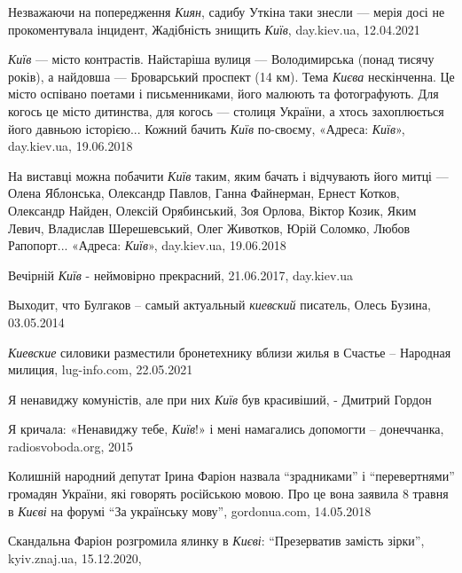 Незважаючи на попередження \emph{Киян}, садибу Уткіна таки знесли — мерія досі не
прокоментувала інцидент, Жадібність знищить \emph{Київ}, day.kiev.ua, 12.04.2021

\emph{Київ} — місто контрастів. Найстаріша вулиця — Володимирська (понад тисячу
років), а найдовша — Броварський проспект (14 км). Тема \emph{Києва} нескінченна. Це
місто оспівано поетами і письменниками, його малюють та фотографують. Для
когось це місто дитинства, для когось — столиця України, а хтось захоплюється
його давньою історією...  Кожний бачить \emph{Київ} по-своєму, 
«Адреса: \emph{Київ}», day.kiev.ua, 19.06.2018

На виставці можна побачити \emph{Київ} таким, яким бачать і відчувають його митці —
Олена Яблонська, Олександр Павлов, Ганна Файнерман, Ернест Котков, Олександр
Найден, Олексій Орябинський, Зоя Орлова, Віктор Козик, Яким Левич, Владислав
Шерешевський, Олег Животков, Юрій Соломко, Любов Рапопорт...
«Адреса: \emph{Київ}», day.kiev.ua, 19.06.2018

Вечірній \emph{Київ} - неймовірно прекрасний, 21.06.2017, day.kiev.ua

Выходит, что Булгаков – самый актуальный \emph{киевский} писатель, Олесь
Бузина, 03.05.2014

\emph{Киевские} силовики разместили бронетехнику вблизи жилья в Счастье – Народная
милиция, lug-info.com, 22.05.2021

Я ненавиджу комуністів, але при них \emph{Київ} був красивіший, - Дмитрий Гордон

Я кричала: «Ненавиджу тебе, \emph{Київ}!» і мені намагались допомогти –
донеччанка, radiosvoboda.org, 2015

Колишній народний депутат Ірина Фаріон назвала \enquote{зрадниками} і
\enquote{перевертнями} громадян України, які говорять російською мовою. Про це
вона заявила 8 травня в \emph{Києві} на форумі \enquote{За українську мову},
gordonua.com, 14.05.2018

Скандальна Фаріон розгромила ялинку в \emph{Києві}: \enquote{Презерватив замість
зірки}, kyiv.znaj.ua, 15.12.2020,
